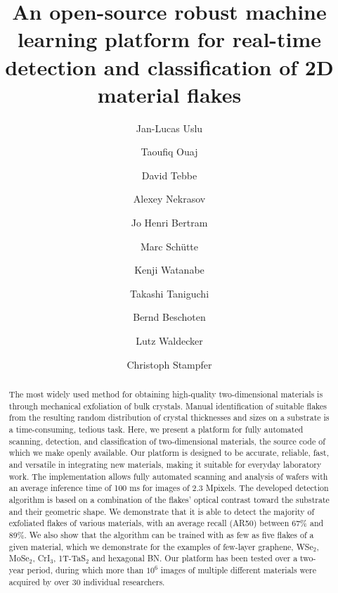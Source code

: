 \documentclass[reprint, prl, superscriptaddress, floatfix]{revtex4-2}
\begin{document}
\title{An open-source robust machine learning platform for real-time detection and classification of 2D material flakes}

\author{Jan-Lucas Uslu} 
\author{Taoufiq Ouaj} 
\author{David Tebbe}
\author{Alexey Nekrasov}
\author{Jo Henri Bertram}
\author{Marc Sch\"utte}
\author{Kenji Watanabe}
\author{Takashi Taniguchi}
\author{Bernd Beschoten} 
\author{Lutz Waldecker} 
\author{Christoph Stampfer}


\begin{abstract}

The most widely used method for obtaining high-quality two-dimensional materials is through mechanical exfoliation of bulk crystals.
Manual identification of suitable flakes from the resulting random distribution of crystal thicknesses and sizes on a substrate is a time-consuming, tedious task.
Here, we present a platform for fully automated scanning, detection, and classification of two-dimensional materials, the source code of which we make openly available.
Our platform is designed to be accurate, reliable, fast, and versatile in integrating new materials, making it suitable for everyday laboratory work.
The implementation allows fully  automated scanning and analysis of wafers with an average inference time of 100 ms for images of 2.3 Mpixels. 
The developed detection algorithm is based on a combination of the flakes' optical contrast toward the substrate and their geometric shape.
We demonstrate that it is able to detect the majority of exfoliated flakes of various materials, with an average recall (AR50) between 67\% and 89\%. 
We also show that the algorithm can be trained with as few as five flakes of a given material, which we demonstrate for the examples of few-layer graphene, WSe$_2$,  MoSe$_2$, CrI$_3$, 1T-TaS$_2$ and hexagonal BN. 
Our platform has been tested over a two-year period, during which more than $10^6$ images of multiple different materials were acquired by over 30 individual researchers.  
 
\end{abstract}
\end{document}
